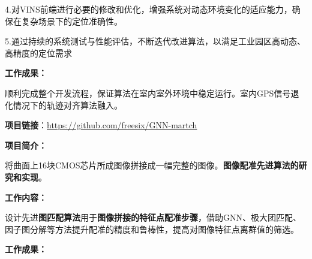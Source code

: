 \documentclass{resume}
\begin{document}
\hspace{20pt} 4.对VINS前端进行必要的修改和优化，增强系统对动态环境变化的适应能力，确保在复杂场景下的定位准确性。

\hspace{20pt} 5.通过持续的系统测试与性能评估，不断迭代改进算法，以满足工业园区高动态、高精度的定位需求

\textbf{\textcolor[RGB]{80,100,190}{工作成果：}}

\hspace{20pt} 顺利完成整个开发流程，保证算法在室内室外环境中稳定运行。室内GPS信号退化情况下的轨迹对齐算法融入。


\textbf{\textcolor[RGB]{80,100,190}{项目链接}}：\hyperlink{https://github.com/freesix/GNN-martch}
{https://github.com/freesix/GNN-martch}

\textbf{\textcolor[RGB]{80,100,190}{项目简介：}}

\hspace{20pt} 将曲面上16块CMOS芯片所成图像拼接成一幅完整的图像。\textbf{图像配准先进算法的研究和实现}。

\textbf{\textcolor[RGB]{80,100,190}{工作内容：}}

\hspace{20pt} 设计先进\textbf{图匹配算法}用于\textbf{图像拼接的特征点配准步骤}，借助GNN、极大团匹配、
因子图分解等方法提升配准的精度和鲁棒性，提高对图像特征点离群值的筛选。

\textbf{\textcolor[RGB]{80,100,190}{工作成果：}}
\end{document}
